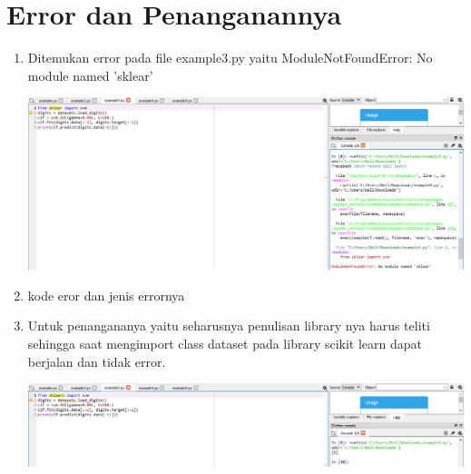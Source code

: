 \section{Error dan Penanganannya}
\begin{enumerate}
    \item Ditemukan error pada file example3.py yaitu ModuleNotFoundError: No module named 'sklear'
      \begin{center}
    \includegraphics[width=.8\textwidth]{figures/1184098/chapter 1/erro1.png}
    \end{center}
    \item kode eror dan jenis errornya
    \item Untuk penangananya yaitu seharusnya penulisan library nya harus teliti sehingga saat mengimport class dataset pada library scikit learn dapat berjalan dan tidak error. 
     \begin{center}
    \includegraphics[width=.8\textwidth]{figures/1184098/chapter 1/error2.png}
    \end{center}
\end{enumerate}


